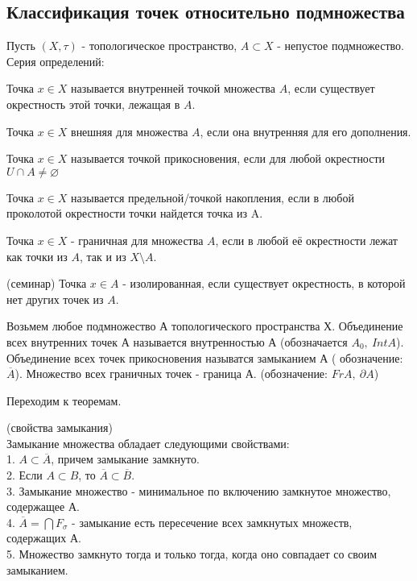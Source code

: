 \subsection{Классификация точек относительно подмножества}
Пусть $(X,\tau)$ - топологическое пространство, $A\subset X$ - непустое 
подмножество. Серия определений:
\begin{defin}
Точка $x\in X$ называется внутренней точкой множества  $A$, если существует
окрестность этой точки, лежащая в $A$.
\end{defin}
\begin{defin}
Точка $x\in X$ внешняя для множества $A$, если она внутренняя для его 
дополнения.
\end{defin}
\begin{defin}
Точка $x\in X$ называется точкой прикосновения, если для любой окрестности
 $U\cap A\ne\varnothing$
\end{defin}
\begin{defin}
Точка $x\in X$ называется предельной/точкой накопления, если в любой 
проколотой окрестности точки найдется точка из A.
\end{defin}
\begin{defin}
Точка $x\in X$ - граничная для множества $A$, если в любой её окрестности лежат
как точки из $A$, так и из $X\setminus A$. 
\end{defin}
\begin{defin} (семинар) 
    Точка $x\in A$ - изолированная, если существует окрестность, в которой
    нет других точек из $A$. 
\end{defin}
\begin{defin}
 Возьмем любое подмножество А топологического пространства Х. Объединение
 всех внутренних точек А называется внутренностью А (обозначается $A_0,~
 Int A$). Объединение всех точек прикосновения называтся замыканием А (
 обозначение: $\overline{A}$). Множество всех граничных точек - граница А. 
 (обозначение: $FrA,~\partial A$)
\end{defin}
Переходим к теоремам. 
\begin{theor}
 (свойства замыкания)\\
 Замыкание множества обладает следующими свойствами:\\
 1. $A\subset \overline{A}$, причем замыкание замкнуто.\\
 2. Если $A\subset B$, то $\overline{A}\subset \overline{B}$.\\
 3. Замыкание множество - минимальное по включению замкнутое множество, 
 содержащее А.\\
 4. $\overline{A}=\bigcap F_\sigma$ - замыкание есть пересечение всех 
 замкнутых множеств, содержащих А.\\
 5. Множество замкнуто тогда и только тогда, когда оно совпадает со своим
 замыканием.
\end{theor}
